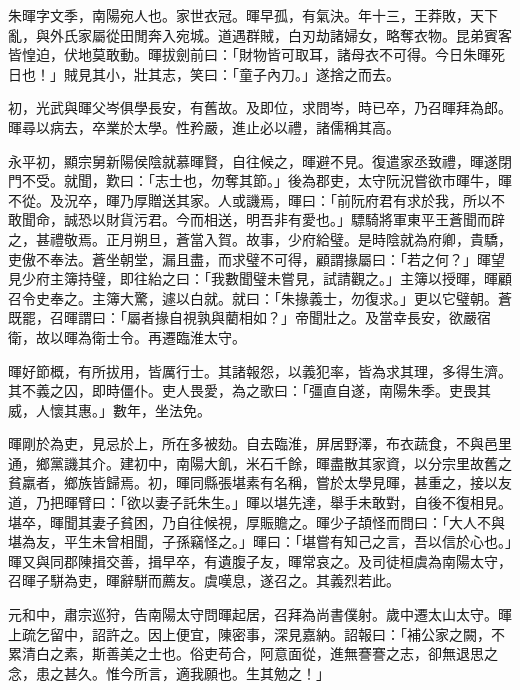 
\begin{pinyinscope}
朱暉字文季，南陽宛人也。家世衣冠。暉早孤，有氣決。年十三，王莽敗，天下亂，與外氏家屬從田閒奔入宛城。道遇群賊，白刃劫諸婦女，略奪衣物。昆弟賓客皆惶迫，伏地莫敢動。暉拔劍前曰：「財物皆可取耳，諸母衣不可得。今日朱暉死日也！」賊見其小，壯其志，笑曰：「童子內刀。」遂捨之而去。

初，光武與暉父岑俱學長安，有舊故。及即位，求問岑，時已卒，乃召暉拜為郎。暉尋以病去，卒業於太學。性矜嚴，進止必以禮，諸儒稱其高。

永平初，顯宗舅新陽侯陰就慕暉賢，自往候之，暉避不見。復遣家丞致禮，暉遂閉門不受。就聞，歎曰：「志士也，勿奪其節。」後為郡吏，太守阮況嘗欲市暉牛，暉不從。及況卒，暉乃厚贈送其家。人或譏焉，暉曰：「前阮府君有求於我，所以不敢聞命，誠恐以財貨污君。今而相送，明吾非有愛也。」驃騎將軍東平王蒼聞而辟之，甚禮敬焉。正月朔旦，蒼當入賀。故事，少府給璧。是時陰就為府卿，貴驕，吏傲不奉法。蒼坐朝堂，漏且盡，而求璧不可得，顧謂掾屬曰：「若之何？」暉望見少府主簿持璧，即往紿之曰：「我數聞璧未嘗見，試請觀之。」主簿以授暉，暉顧召令史奉之。主簿大驚，遽以白就。就曰：「朱掾義士，勿復求。」更以它璧朝。蒼既罷，召暉謂曰：「屬者掾自視孰與藺相如？」帝聞壯之。及當幸長安，欲嚴宿衛，故以暉為衛士令。再遷臨淮太守。

暉好節概，有所拔用，皆厲行士。其諸報怨，以義犯率，皆為求其理，多得生濟。其不義之囚，即時僵仆。吏人畏愛，為之歌曰：「彊直自遂，南陽朱季。吏畏其威，人懷其惠。」數年，坐法免。

暉剛於為吏，見忌於上，所在多被劾。自去臨淮，屏居野澤，布衣蔬食，不與邑里通，鄉黨譏其介。建初中，南陽大飢，米石千餘，暉盡散其家資，以分宗里故舊之貧羸者，鄉族皆歸焉。初，暉同縣張堪素有名稱，嘗於太學見暉，甚重之，接以友道，乃把暉臂曰：「欲以妻子託朱生。」暉以堪先達，舉手未敢對，自後不復相見。堪卒，暉聞其妻子貧困，乃自往候視，厚賑贍之。暉少子頡怪而問曰：「大人不與堪為友，平生未曾相聞，子孫竊怪之。」暉曰：「堪嘗有知己之言，吾以信於心也。」暉又與同郡陳揖交善，揖早卒，有遺腹子友，暉常哀之。及司徒桓虞為南陽太守，召暉子駢為吏，暉辭駢而薦友。虞嘆息，遂召之。其義烈若此。

元和中，肅宗巡狩，告南陽太守問暉起居，召拜為尚書僕射。歲中遷太山太守。暉上疏乞留中，詔許之。因上便宜，陳密事，深見嘉納。詔報曰：「補公家之闕，不累清白之素，斯善美之士也。俗吏苟合，阿意面從，進無謇謇之志，卻無退思之念，患之甚久。惟今所言，適我願也。生其勉之！」


\end{pinyinscope}
